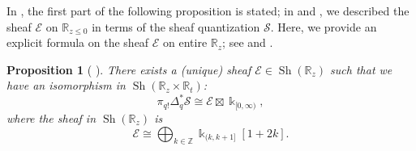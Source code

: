 \documentclass[11pt]{amsart}
\numberwithin{equation}{section}
\theoremstyle{plain}
\newtheorem{Prop}[prop]{Proposition}
\theoremstyle{definition}
\theoremstyle{remark}
\newcommand{\bZ} { {\mathbb{Z}}}
\newcommand{\bR} { {\mathbb{R}}}
\newcommand{\cE} { {\mathcal{E}}}
\newcommand{\Sh} { {\operatorname{Sh}}}
\begin{document}
In \textnormal{\cite[Formula (38)]{chiu2017}}, the first part of the following proposition is stated; in \cite[Proposition 3.9]{Capacities2021} and \cite[Proposition 4.10]{zhangthesis}, we described  the sheaf $\cE$ on $\bR_{z\leq 0}$ in terms of the sheaf quantization $\mathcal{S}$. Here, we provide an explicit formula on the sheaf $\cE$ on entire $\bR_z$; see \cite[Proposition 3.11]{Capacities2021} and \cite[Proposition 4.12]{zhangthesis}.
\begin{Prop}[{\cite[Propositions 3.9 \& 3.11]{Capacities2021} \cite[Proposition 4.10 \& 4.12]{zhangthesis}}]\label{prop:chiu result on loop sheaf} There exists a (unique) sheaf ${\mathcal{E}}\in \Sh(\bR_z)$ such that we have an isomorphism in $\Sh(\bR_z\times \bR_t)$:
\begin{equation}\label{loop sheaf of GF model of rotation non-equi}
 \pi_{q!}\Delta_q^{*} \mathcal{S} \cong \cE \boxtimes {\Bbbk }_{[0,\infty)},   
\end{equation}
where the sheaf in $\Sh(\bR_z)$ is
\begin{equation}\label{E sheaf of GF model of rotation}
{\mathcal{E} }\cong  \bigoplus_{k\in \bZ}\Bbbk _{(k,k+1]}[1+2k].
\end{equation}
\end{Prop}
\end{document}
